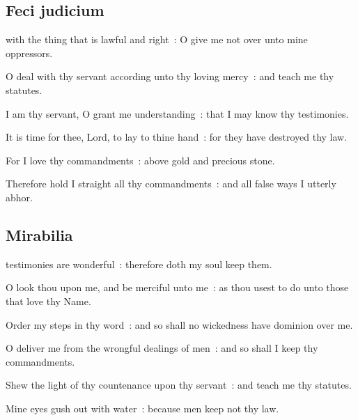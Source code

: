 \clearpage
\subsection{Feci judicium}


 with the thing that is lawful and right~: O give me not over unto mine oppressors.\par
{}
O deal with thy servant according unto thy loving mercy~: and teach me thy statutes.\par
{}I am thy servant, O grant me understanding~: that I may know thy testimonies.\par
{}It is time for thee, Lord, to lay to thine hand~: for they have destroyed thy law.\par
{}For I love thy commandments~: above gold and precious stone.\par
{}Therefore hold I straight all thy commandments~: and all false ways I utterly abhor.\par


\subsection{Mirabilia}


 testimonies are wonderful~: therefore doth my soul keep them.\par
{}
O look thou upon me, and be merciful unto me~: as thou usest to do unto those that love thy Name.\par
{}Order my steps in thy word~: and so shall no wickedness have dominion over me.\par
{}O deliver me from the wrongful dealings of men~: and so shall I keep thy commandments.\par
{}Shew the light of thy countenance upon thy servant~: and teach me thy statutes.\par
{}Mine eyes gush out with water~: because men keep not thy law.\par


